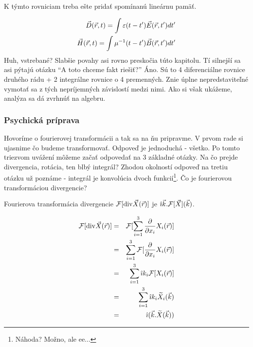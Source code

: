 K týmto rovniciam treba ešte pridať spomínanú lineárnu pamäť.

\begin{eqnarray}
  \vec{D}{(\vec{r},t)} = \int \varepsilon(t-t') \vec{E}(\vec{r},t') dt' \\
  \vec{H}{(\vec{r},t)} = \int \mu^{-1}(t-t') \vec{B}(\vec{r},t') dt'
\end{eqnarray}
Huh, vstrebané? Slabšie povahy asi rovno preskočia túto kapitolu. Tí
silnejší sa asi pýtajú otázku ``A toto chceme fakt riešiť?'' Áno.
Sú to 4 diferenciálne rovnice druhého rádu + 2 integrálne rovnice o 4
premenných. Znie úplne nepredstaviteľné vymotať sa z tých nepríjemných
závislostí medzi nimi. Ako si však ukážeme, analýza sa dá zvrhnúť na
algebru.

\subsubsection{Psychická príprava}
Hovoríme o fourierovej transformácii a tak sa na ňu pripravme. V prvom
rade si ujasnime čo budeme transformovať. Odpoveď je jednoduchá -
všetko. Po tomto triezvom uvážení môžeme začať odpovedať na 3 základné
otázky. Na čo prejde divergencia, rotácia, ten blbý integrál? Zhodou
okolností odpoveď na tretiu otázku už poznáme - integrál je konvolúcia
dvoch funkcií\footnote{Náhoda? Možno, ale ee...}. Čo je fourierovou
transformáciou divergencie?


\begin{veta}
Fourierova transformácia divergencie
$\mathcal{F}[{\rm div}{\vec{X}}(\vec{r})]$  je $ \hat{\imath} \vec{k} .
\mathcal{F}[\vec{X}](\vec{k})$.
\end{veta}
\begin{dokaz}

\def\r{(\vektor{r})}
\def\k{(\vektor{k})}

\begin{eqnarray*}
    \fourier[\div{\vektor{X}\r}] &=& \fourier[\sum_{i=1}^3 \pd{}{x_i}
    X_i\r] \\
    &=& \sum_{i=1}^3 \fourier[ \pd{}{x_i} X_i\r]  \\
    &=& \sum_{i=1}^3 \imag k_i \fourier[X_i\r] \\
    &=& \sum_{i=1}^3 \imag k_i \dual{X}_i \k \\
    &=& \imag ( \vektor{k} . \dual{X} \k)
\end{eqnarray*}
\end{dokaz}

